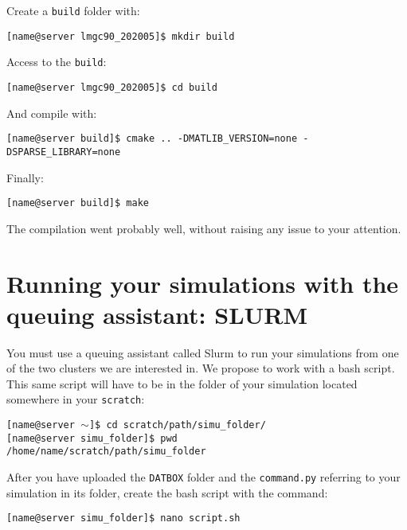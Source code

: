 \documentclass[12pt]{article}
\begin{document}
Create a \texttt{build} folder with:
\begin{tcolorbox}
\texttt{[name@server lmgc90\_202005]\$ mkdir build} 
\end{tcolorbox}
Access to the \texttt{build}:
\begin{tcolorbox}
\texttt{[name@server lmgc90\_202005]\$ cd build}
\end{tcolorbox}
And compile with:
\begin{tcolorbox}
\texttt{[name@server build]\$ cmake .. -DMATLIB\_VERSION=none -DSPARSE\_LIBRARY=none} 
\end{tcolorbox}
\vspace{0.5cm}
Finally:
\begin{tcolorbox}
\texttt{[name@server build]\$ make} 
\end{tcolorbox}

The compilation went probably well, without raising any issue to your attention.


\section*{Running your simulations with the queuing assistant: SLURM}
You must use a queuing assistant called Slurm to run your simulations from one of the two clusters we are interested in.  We propose to work with a bash script. This same script will have to be in the folder of your simulation located somewhere in your \texttt{scratch}:
\begin{tcolorbox}
\texttt{[name@server $\sim$]\$ cd scratch/path/simu\_folder/}\\
\texttt{[name@server simu\_folder]\$ pwd}\\
\texttt{/home/name/scratch/path/simu\_folder}
\end{tcolorbox}

After you have uploaded the \texttt{DATBOX} folder and the \texttt{command.py} referring to your simulation in its folder, create the bash script with the command:
\begin{tcolorbox}
\texttt{[name@server simu\_folder]\$ nano script.sh} 
\end{tcolorbox}
\end{document}
